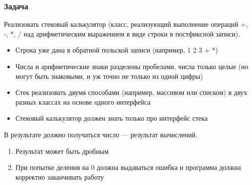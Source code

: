 \documentclass{../../slides-style}
\begin{document}
    \begin{frame}[plain]
        \titlepage
    \end{frame}

    \begin{frame}
        \frametitle{Задача}
        Реализовать стековый калькулятор (класс, реализующий выполнение операций +, -, *, / над арифметическим выражением в виде строки в постфиксной записи).
        \begin{itemize}
            \item Строка уже дана в обратной польской записи (например, 1 2 3 + *)
            \item Числа и арифметические знаки разделены пробелами, числа только целые (но могут быть знаковыми, и уж точно не только из одной цифры)
            \item Стек реализовать двумя способами (например, массивом или списком) в двух разных классах на основе одного интерфейса
            \item Стековый калькулятор должен знать только про интерфейс стека
        \end{itemize} 
        
        В результате должно получаться число — результат вычислений. 
        \begin{enumerate}
            \item Результат может быть дробным
            \item При попытке деления на 0 должна выдаваться ошибка и программа должна корректно заканчивать работу
        \end{enumerate}
    \end{frame}
\end{document}
